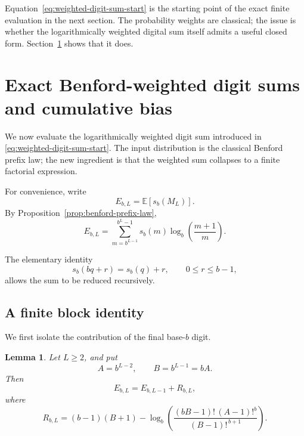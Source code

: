 \documentclass[11pt]{article}
\newtheorem{lemma}[theorem]{Lemma}
\theoremstyle{definition}
\theoremstyle{remark}
\begin{document}
Equation~\eqref{eq:weighted-digit-sum-start} is the starting point of
the exact finite evaluation in the next section.  The probability
weights are classical; the issue is whether the logarithmically
weighted digital sum itself admits a useful closed form.
Section~\ref{sec:finite-bias} shows that it does.


\section{Exact Benford-weighted digit sums and cumulative bias}
\label{sec:finite-bias}

We now evaluate the logarithmically weighted digit sum introduced in
\eqref{eq:weighted-digit-sum-start}.  The input distribution is the
classical Benford prefix law; the new ingredient is that the weighted
sum collapses to a finite factorial expression.

For convenience, write
\begin{equation}
    E_{b,L}
    =
    \mathbb E[s_b(M_L)].
    \label{eq:E-bL-definition}
\end{equation}
By Proposition~\ref{prop:benford-prefix-law},
\begin{equation}
    E_{b,L}
    =
    \sum_{m=b^{L-1}}^{b^L-1}
    s_b(m)
    \log_b\!\left(\frac{m+1}{m}\right).
    \label{eq:E-bL-raw}
\end{equation}

The elementary identity
\begin{equation}
    s_b(bq+r)=s_b(q)+r,
    \qquad
    0\le r\le b-1,
    \label{eq:digit-sum-recursion}
\end{equation}
allows the sum to be reduced recursively.

\subsection{A finite block identity}
\label{subsec:finite-block-identity}

We first isolate the contribution of the final base-\(b\) digit.

\begin{lemma}
\label{lem:last-digit-block}
Let \(L\ge2\), and put
\[
    A=b^{L-2},
    \qquad
    B=b^{L-1}=bA.
\]
Then
\begin{equation}
    E_{b,L}
    =
    E_{b,L-1}
    +
    R_{b,L},
    \label{eq:E-recursion}
\end{equation}
where
\begin{equation}
\boxed{
    R_{b,L}
    =
    (b-1)(B+1)
    -
    \log_b
    \left(
        \frac{
            (bB-1)!\,(A-1)!^b
        }{
            (B-1)!^{\,b+1}
        }
    \right).
}
\label{eq:R-bL-closed}
\end{equation}
\end{lemma}
\end{document}
